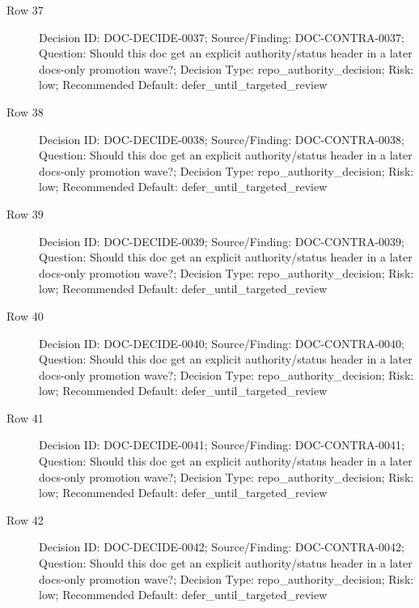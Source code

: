\documentclass[10.5pt,a4paper,openany]{book}
\begin{document}
\begin{description}
\item[Row 37] Decision ID: DOC-\allowbreak{}DECIDE-\allowbreak{}0037; Source/\allowbreak{}Finding: DOC-\allowbreak{}CONTRA-\allowbreak{}0037; Question: Should this doc get an explicit authority/\allowbreak{}status header in a later docs-\allowbreak{}only promotion wave?; Decision Type: repo\_\allowbreak{}authority\_\allowbreak{}decision; Risk: low; Recommended Default: defer\_\allowbreak{}until\_\allowbreak{}targeted\_\allowbreak{}review
\item[Row 38] Decision ID: DOC-\allowbreak{}DECIDE-\allowbreak{}0038; Source/\allowbreak{}Finding: DOC-\allowbreak{}CONTRA-\allowbreak{}0038; Question: Should this doc get an explicit authority/\allowbreak{}status header in a later docs-\allowbreak{}only promotion wave?; Decision Type: repo\_\allowbreak{}authority\_\allowbreak{}decision; Risk: low; Recommended Default: defer\_\allowbreak{}until\_\allowbreak{}targeted\_\allowbreak{}review
\item[Row 39] Decision ID: DOC-\allowbreak{}DECIDE-\allowbreak{}0039; Source/\allowbreak{}Finding: DOC-\allowbreak{}CONTRA-\allowbreak{}0039; Question: Should this doc get an explicit authority/\allowbreak{}status header in a later docs-\allowbreak{}only promotion wave?; Decision Type: repo\_\allowbreak{}authority\_\allowbreak{}decision; Risk: low; Recommended Default: defer\_\allowbreak{}until\_\allowbreak{}targeted\_\allowbreak{}review
\item[Row 40] Decision ID: DOC-\allowbreak{}DECIDE-\allowbreak{}0040; Source/\allowbreak{}Finding: DOC-\allowbreak{}CONTRA-\allowbreak{}0040; Question: Should this doc get an explicit authority/\allowbreak{}status header in a later docs-\allowbreak{}only promotion wave?; Decision Type: repo\_\allowbreak{}authority\_\allowbreak{}decision; Risk: low; Recommended Default: defer\_\allowbreak{}until\_\allowbreak{}targeted\_\allowbreak{}review
\item[Row 41] Decision ID: DOC-\allowbreak{}DECIDE-\allowbreak{}0041; Source/\allowbreak{}Finding: DOC-\allowbreak{}CONTRA-\allowbreak{}0041; Question: Should this doc get an explicit authority/\allowbreak{}status header in a later docs-\allowbreak{}only promotion wave?; Decision Type: repo\_\allowbreak{}authority\_\allowbreak{}decision; Risk: low; Recommended Default: defer\_\allowbreak{}until\_\allowbreak{}targeted\_\allowbreak{}review
\item[Row 42] Decision ID: DOC-\allowbreak{}DECIDE-\allowbreak{}0042; Source/\allowbreak{}Finding: DOC-\allowbreak{}CONTRA-\allowbreak{}0042; Question: Should this doc get an explicit authority/\allowbreak{}status header in a later docs-\allowbreak{}only promotion wave?; Decision Type: repo\_\allowbreak{}authority\_\allowbreak{}decision; Risk: low; Recommended Default: defer\_\allowbreak{}until\_\allowbreak{}targeted\_\allowbreak{}review

\end{description}
\end{document}
